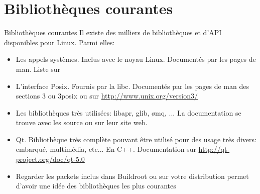 \section{Bibliothèques courantes}

\begin{frame}[fragile=singleslide]{Bibliothèques courantes}
  Il existe  des milliers de  bibliothèques et d'API  disponibles pour
  Linux. Parmi elles:
  \begin{itemize}
  \item Les  appels systèmes. Inclus  avec le noyau  Linux. Documentés
    par les pages de man. Liste sur 
  \item L'interface  Posix.  Fournis par la libc.   Documentés par les
    pages    de   man   des    sections   3    ou   3posix    ou   sur
    \url{http://www.unix.org/version3/}
  \item Les bibliothèques très  utilisées: libapr, glib, ømq, ...  La
    documentation se trouve avec les source ou sur leur site web.
  \item Qt.  Bibliothèque très complète pouvant être  utilisé pour des
    usage    très   divers:    embarqué,    multimédia,   etc...    En
    C++. Documentation sur \url{http://qt-project.org/doc/qt-5.0}
  \item  Regarder  les packets  inclus  dans  Buildroot  ou sur  votre
    distribution permet  d'avoir une  idée des bibliothèques  les plus
    courantes
  \end{itemize}
\end{frame}


